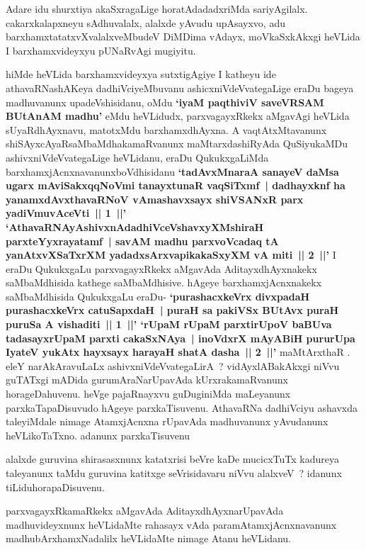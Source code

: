 \begin{artha}
Adare idu shurxtiya akaSxragaLige horatAdadadxriMda sariyAgilalx. cakarxkalapxneyu  sAdhuvalalx, alalxde yAvudu upAsayxvo, adu barxhamxtatatxvXvalalxveMbudeV DiMDima	vAdayx, moVkaSxkAkxgi heVLida I barxhamxvideyxyu pUNaRvAgi mugiyitu.
\end{artha}

\begin{artha}
hiMde heVLida barxhamxvideyxya sutxtigAgiye I katheyu ide \ndash athavaRNashAKeya dadhiVciyeMbuvanu ashicxniVdeVvategaLige eraDu bageya madhuvanunx upadeVshisidanu, oMdu \textbf{`iyaM paqthiviV saveVRSAM BUtAnAM madhu'} eMdu heVLidudx, parxvagayxRkekx aMgavAgi heVLida sUyaRdhAyxnavu, matotxMdu barxhamxdhAyxna. A vaqtAtxMtavanunx shiSAyxcAyaRsaMbaMdhakamaRvanunx maMtarxdashiRyAda QuSiyukaMDu  ashivxniVdeVvategaLige heVLidanu, eraDu QukukxgaLiMda barxhamxjAcnxnavanunx\break boVdhisidanu \textbf{`tadAvxMnaraA sanayeV daMsa ugarx mAviSakxqqNoVmi tanayxtunaR vaqSiTxmf~| dadhayxknf ha yanamxdAvxthavaRNoV vAmashavxsayx shiVSANxR parx yadiVmuvAceVti~|| 1~||' `AthavaRNAyAshivxnAdadhiVceVshavxyXMshiraH parxteYyxrayatamf~| savAM madhu parxvoVcadaq tA  yanAtxvXSaTxrXM yadadxsArxvapikakaSxyXM vA miti~|| 2~||'} I eraDu QukukxgaLu parxvagayxRkekx aMgavAda AditayxdhAyxnakekx saMbaMdhisida kathege saMbaMdhisive. hAgeye barxhamxjAcnxnakekx saMbaMdhisida QukukxgaLu eraDu- \textbf{`purashacxkeVrx divxpadaH purashacxkeVrx catuSapxdaH~| puraH sa pakiVSx BUtAvx puraH puruSa A vishaditi~|| 1~||' `rUpaM rUpaM parxtirUpoV baBUva tadasayxrUpaM parxti cakaSxNAya~| inoVdxrX mAyABiH pururUpa IyateV yukAtx hayxsayx harayaH shatA dasha~|| 2~||'}  maMtArxthaR . eleY narAkAravuLaLx ashivxniVdeVvategaLirA~? vidAyxlABakAkxgi niVvu guTATxgi mADida gurumAraNarUpavAda kUrxrakamaRvanunx horageDahuvenu. heVge pajaRnayxvu guDuginiMda maLeyanunx parxkaTapaDisuvudo hAgeye parxkaTisuvenu. AthavaRNa dadhiVciyu ashavxda taleyiMdale nimage AtamxjAcnxna rUpavAda madhuvanunx yAvudanunx heVLikoTaTxno. adanunx parxkaTisuvenu
\end{artha}

\begin{artha}
alalxde guruvina shirasasxnunx katatxrisi beVre kaDe mucicxTuTx kadureya taleyanunx taMdu guruvina katitxge seVrisidavaru niVvu alalxveV~? idanunx tiLidu\break horapaDisuvenu.
\end{artha}

\begin{artha}
parxvagayxRkamaRkekx aMgavAda AditayxdhAyxnarUpavAda madhuvideyxnunx heVLidaMte rahasayx vAda paramAtamxjAcnxnavanunx madhubArxhamxNadalilx heVLidaMte nimage Atanu heVLidanu.
\end{artha}

